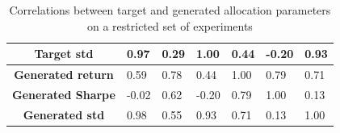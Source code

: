 \begin{table}[h]
{\begin{tabular}{|c|l|l|l|l|l|l|}
			\textbf{Target std}             & 0.97                                                                                   & 0.29                                                                                   & 1.00                                                                                & 0.44                                                                                      & -0.20                                                                                     & 0.93                                                                                   \\ \hline
			\textbf{Generated return}       & 0.59                                                                                   & 0.78                                                                                   & 0.44                                                                                & 1.00                                                                                      & 0.79                                                                                      & 0.71                                                                                   \\ \hline
			\textbf{Generated Sharpe}       & -0.02                                                                                  & 0.62                                                                                   & -0.20                                                                               & 0.79                                                                                      & 1.00                                                                                      & 0.13                                                                                   \\ \hline
			\textbf{Generated std}          & 0.98                                                                                   & 0.55                                                                                   & 0.93                                                                                & 0.71                                                                                      & 0.13                                                                                      & 1.00                                                                                   \\ \hline
		\end{tabular}%
	}
	\caption{Correlations between target and generated allocation parameters on a restricted set of experiments \label{table:parametrization_corr_2}}
\end{table}


